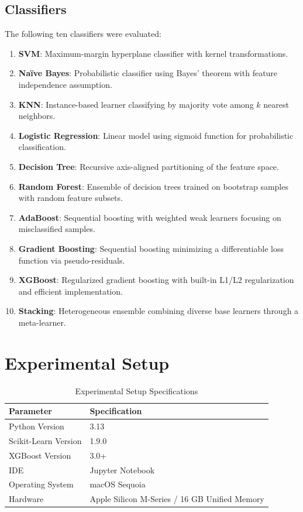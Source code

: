 \documentclass[12pt,a4paper]{article}
\begin{document}
\subsection{Classifiers}
The following ten classifiers were evaluated:
\begin{enumerate}
    \item \textbf{SVM}: Maximum-margin hyperplane classifier with kernel transformations.
    \item \textbf{Na\"ive Bayes}: Probabilistic classifier using Bayes' theorem with feature independence assumption.
    \item \textbf{KNN}: Instance-based learner classifying by majority vote among $k$ nearest neighbors.
    \item \textbf{Logistic Regression}: Linear model using sigmoid function for probabilistic classification.
    \item \textbf{Decision Tree}: Recursive axis-aligned partitioning of the feature space.
    \item \textbf{Random Forest}: Ensemble of decision trees trained on bootstrap samples with random feature subsets.
    \item \textbf{AdaBoost}: Sequential boosting with weighted weak learners focusing on misclassified samples.
    \item \textbf{Gradient Boosting}: Sequential boosting minimizing a differentiable loss function via pseudo-residuals.
    \item \textbf{XGBoost}: Regularized gradient boosting with built-in L1/L2 regularization and efficient implementation.
    \item \textbf{Stacking}: Heterogeneous ensemble combining diverse base learners through a meta-learner.
\end{enumerate}

\section{Experimental Setup}

\begin{table}[H]
\centering
\caption{Experimental Setup Specifications}
\label{tab:exp_setup}
\vspace{0.2cm}
\begin{tabular}{ll}
\toprule
\textbf{Parameter} & \textbf{Specification} \\
\midrule
Python Version & 3.13 \\
Scikit-Learn Version & 1.9.0 \\
XGBoost Version & 3.0+ \\
IDE & Jupyter Notebook \\
Operating System & macOS Sequoia \\
Hardware & Apple Silicon M-Series / 16 GB Unified Memory \\
\bottomrule
\end{tabular}
\end{table}
\end{document}

